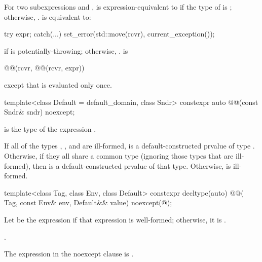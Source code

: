 \pnum
For two subexpressions  and ,
 is expression-equivalent to
if the type of  is ;
otherwise, .
 is equivalent to:
\begin{codeblock}
try {
  expr;
} catch(...) {
  set_error(std::move(rcvr), current_exception());
}
\end{codeblock}
if  is potentially-throwing; otherwise, .
 is
\begin{codeblock}
@@(rcvr, @@(rcvr, expr))
\end{codeblock}
except that  is evaluated only once.

\begin{itemdecl}
template<class Default = default_domain, class Sndr>
  constexpr auto @@(const Sndr& sndr) noexcept;
\end{itemdecl}

\begin{itemdescr}
\pnum
{} is the type of the expression
.

\pnum
\effects
If all of the types
,
, and\linebreak
{} are ill-formed,
 is
a default-constructed prvalue of type .
Otherwise, if they all share a common type
(ignoring those types that are ill-formed),
then  is
a default-constructed prvalue of that type.
Otherwise,  is ill-formed.
\end{itemdescr}

\begin{itemdecl}
template<class Tag, class Env, class Default>
  constexpr decltype(auto) @@(
    Tag, const Env& env, Default&& value) noexcept(@\seebelow@);
\end{itemdecl}

\begin{itemdescr}
\pnum
Let  be the expression 
if that expression is well-formed;
otherwise, it is .

\pnum
\returns
{}.

\pnum
\remarks
The expression in the noexcept clause is .
\end{itemdescr}

